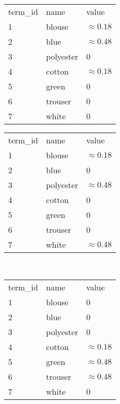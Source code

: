 \begin{table}
    \center

    \begin{tabular}{ l|l|l }
        \rowcolor{\dustRowHead}
        \multicolumn{3}{ c }{\textbf{$\text{tf-idf}_\text{document\_1}$}}\\\hline
        term\_id & name & value\\\hline
        1   & blouse    & $\approx 0.18$\\
        2   & blue      & $\approx 0.48$\\
        3   & polyester & 0\\
        4   & cotton    & $\approx 0.18$\\
        5   & green     & 0\\
        6   & trouser   & 0\\
        7   & white     & 0\\
    \end{tabular}
    \quad
    \begin{tabular}{ l|l|l }
        \rowcolor{\dustRowHead}
        \multicolumn{3}{ c }{\textbf{$\text{tf-idf}_\text{document\_2}$}}\\\hline
        term\_id & name & value\\\hline
        1    & blouse   & $\approx 0.18$\\
        2    & blue     & 0\\
        3    & polyester& $\approx 0.48$\\
        4    & cotton   & 0\\
        5    & green    & 0\\
        6    & trouser  & 0\\
        7    & white    & $\approx 0.48$\\
    \end{tabular}

    \hfill\\

    \begin{tabular}{ l|l|l }
        \rowcolor{\dustRowHead}
        \multicolumn{3}{ c }{\textbf{$\text{tf-idf}_\text{document\_3}$}}\\\hline

        term\_id & name & value\\\hline
        1        & blouse      & 0\\
        2        & blue        & 0\\
        3        & polyester   & 0\\
        4        & cotton      & $\approx 0.18$\\
        5        & green       & $\approx 0.48$\\
        6        & trouser     & $\approx 0.48$\\
        7        & white       & 0\\
    \end{tabular}



\end{table}

